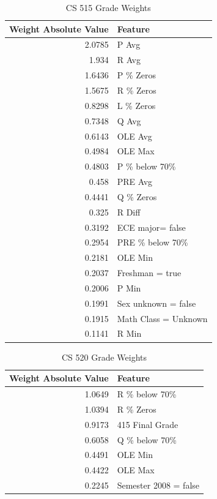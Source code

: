 \documentclass[letterpaper,11pt]{article}
\begin{document}
\begin{table}[h!]
\begin{center}
  \begin{tabular}{ r | l }
Weight Absolute Value & Feature   \\ \hline
2.0785 & P Avg  \\
1.934 & R Avg  \\
1.6436 & P \% Zeros  \\
1.5675 & R \% Zeros  \\
0.8298 & L \% Zeros  \\
0.7348 & Q Avg  \\
0.6143 & OLE Avg  \\
0.4984 & OLE Max  \\
0.4803 & P \% below 70\%  \\
0.458 & PRE Avg  \\
0.4441 & Q \% Zeros  \\
0.325 & R Diff  \\
0.3192 & ECE major= false  \\
0.2954 & PRE \% below 70\%  \\
0.2181 & OLE Min  \\
0.2037 & Freshman = true  \\
0.2006 & P Min  \\
0.1991 & Sex unknown = false  \\
0.1915 & Math Class = Unknown  \\
0.1141 & R Min
  \end{tabular}
\end{center}
  \caption {CS 515 Grade Weights}
\label{table:515weights}
\end{table}

\begin{table}[h!]
\begin{center}
  \begin{tabular}{ r | l }
Weight Absolute Value & Feature   \\ \hline
1.0649 & R \% below 70\%  \\
1.0394 & R \% Zeros  \\
0.9173 & 415 Final Grade  \\
0.6058 & Q \% below 70\%  \\
0.4491 & OLE Min  \\
0.4422 & OLE Max  \\
0.2245 & Semester 2008 = false 
  \end{tabular}
\end{center}
  \caption {CS 520 Grade Weights}
\label{table:520weights}
\end{table}
\end{document}
